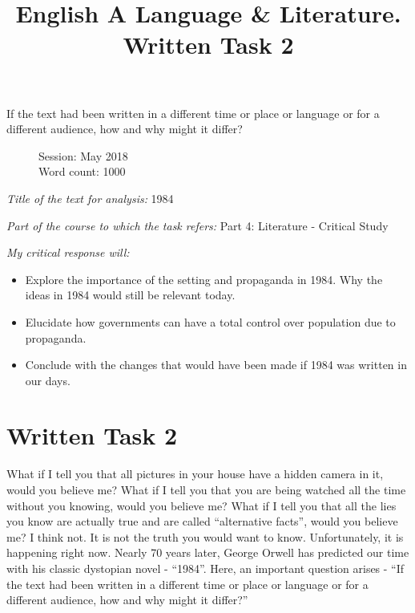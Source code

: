 \documentclass[a4paper,12pt]{article}
\title{English A Language \& Literature. Written Task 2}
\date{}
\author{}
\begin{document}
\maketitle
\begin{center}
If the text had been written in a different time or place or language or for a different audience, how and why might it differ?
\end{center}
\begin{flushleft}
\begin{figure}[b]
Session: May 2018\\
Word count: 1000\\
\end{figure}
\end{flushleft}
\singlespacing
\textit{Title of the text for analysis:} 1984

\textit{Part of the course to which the task refers:} Part 4: Literature - Critical Study 

\textit{My critical response will:}

\begin{itemize}

\item Explore the importance of the setting and propaganda in 1984. Why the ideas in 1984 would still be relevant today.

  \item Elucidate how governments can have a total control over population due to propaganda.

  \item Conclude with the changes that would have been made if 1984 was written in our days.
    
  \end{itemize}
\doublespacing
\section*{Written Task 2}

What if I tell you that all pictures in your house have a hidden camera in it, would you believe me?
What if I tell you that you are being watched all the time without you knowing, would you believe me?
What if I tell you that all the lies you know are actually true and are called ``alternative facts'', would you believe me?
I think not.
It is not the truth you would want to know.
Unfortunately, it is happening right now. Nearly 70 years later, George Orwell has predicted our time with his classic dystopian novel - ``1984''.
Here, an important question arises - ``If the text had been written in a different time or place or language or for a different audience, how and why might it differ?'' \\
\end{document}
